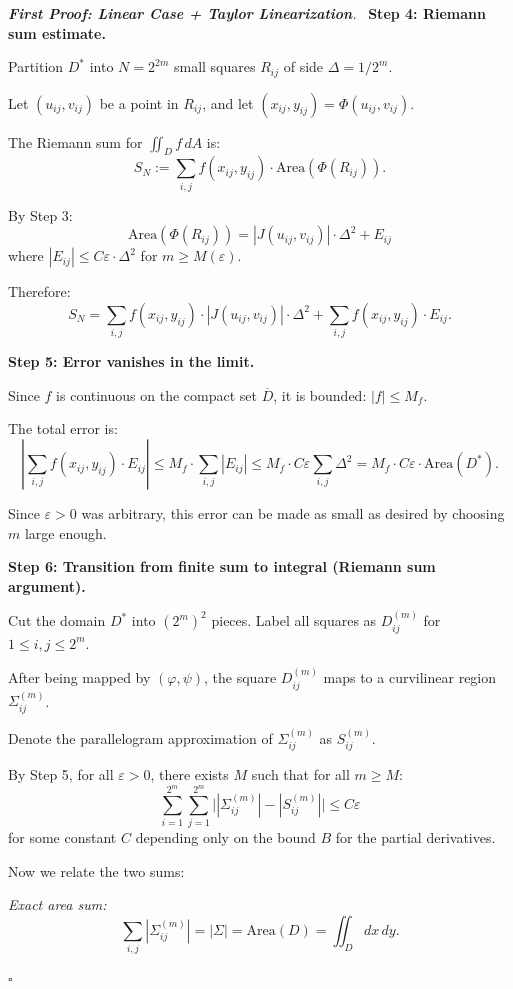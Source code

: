 \documentclass[11pt]{report}
\renewenvironment{proof}[1][Proof]{\par\noindent\textit{#1.}\ }{\hfill$\square$\par\medskip}
\begin{document}
\begin{proof}[\textbf{First Proof: Linear Case + Taylor Linearization}]
\textbf{Step 4: Riemann sum estimate.}

Partition $D^*$ into $N = 2^{2m}$ small squares $R_{ij}$ of side $\Delta = 1/2^m$.

Let $(u_{ij}, v_{ij})$ be a point in $R_{ij}$, and let $(x_{ij}, y_{ij}) = \Phi(u_{ij}, v_{ij})$.

The Riemann sum for $\iint_D f \, dA$ is:
\[
S_N := \sum_{i,j} f(x_{ij}, y_{ij}) \cdot \text{Area}(\Phi(R_{ij})).
\]

By Step 3:
\[
\text{Area}(\Phi(R_{ij})) = |J(u_{ij}, v_{ij})| \cdot \Delta^2 + E_{ij}
\]
where $|E_{ij}| \leq C \varepsilon \cdot \Delta^2$ for $m \geq M(\varepsilon)$.

Therefore:
\[
S_N = \sum_{i,j} f(x_{ij}, y_{ij}) \cdot |J(u_{ij}, v_{ij})| \cdot \Delta^2 + \sum_{i,j} f(x_{ij}, y_{ij}) \cdot E_{ij}.
\]

\textbf{Step 5: Error vanishes in the limit.}

Since $f$ is continuous on the compact set $\overline{D}$, it is bounded: $|f| \leq M_f$.

The total error is:
\[
\left| \sum_{i,j} f(x_{ij}, y_{ij}) \cdot E_{ij} \right| \leq M_f \cdot \sum_{i,j} |E_{ij}| \leq M_f \cdot C\varepsilon \sum_{i,j} \Delta^2 = M_f \cdot C\varepsilon \cdot \text{Area}(D^*).
\]

Since $\varepsilon > 0$ was arbitrary, this error can be made as small as desired by choosing $m$ large enough.

\textbf{Step 6: Transition from finite sum to integral (Riemann sum argument).}

Cut the domain $D^*$ into $(2^m)^2$ pieces. Label all squares as $D_{ij}^{(m)}$ for $1 \leq i, j \leq 2^m$.

After being mapped by $(\varphi, \psi)$, the square $D_{ij}^{(m)}$ maps to a curvilinear region $\Sigma_{ij}^{(m)}$.

Denote the parallelogram approximation of $\Sigma_{ij}^{(m)}$ as $S_{ij}^{(m)}$.

By Step 5, for all $\varepsilon > 0$, there exists $M$ such that for all $m \geq M$:
\[
\sum_{i=1}^{2^m} \sum_{j=1}^{2^m} \big| |\Sigma_{ij}^{(m)}| - |S_{ij}^{(m)}| \big| \leq C\varepsilon
\]
for some constant $C$ depending only on the bound $B$ for the partial derivatives.

Now we relate the two sums:

\textit{Exact area sum:}
\[
\sum_{i,j} |\Sigma_{ij}^{(m)}| = |\Sigma| = \text{Area}(D) = \iint_D dx \, dy.
\]


\end{proof}
\end{document}
